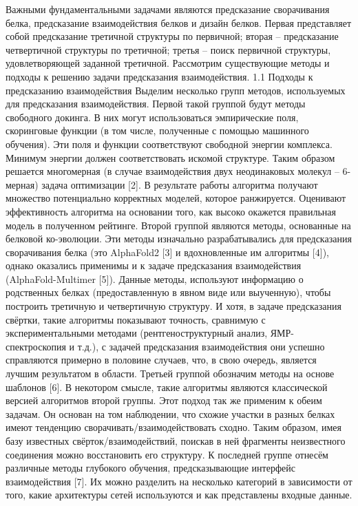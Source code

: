 Важными фундаментальными задачами являются предсказание сворачивания белка, предсказание взаимодействия белков и дизайн белков. Первая представляет собой предсказание третичной структуры по первичной; вторая – предсказание четвертичной структуры по третичной; третья – поиск первичной структуры, удовлетворяющей заданной третичной. Рассмотрим существующие методы и подходы к решению задачи предсказания взаимодействия.
1.1 Подходы к предсказанию взаимодействия
	Выделим несколько групп методов, используемых для предсказания взаимодействия. Первой такой группой будут методы свободного докинга. В них могут использоваться эмпирические поля, скоринговые функции (в том числе, полученные с помощью машинного обучения). Эти поля и функции соответствуют свободной энергии комплекса. Минимум энергии должен соответствовать искомой структуре. Таким образом решается многомерная (в случае взаимодействия двух неодинаковых молекул – 6-мерная) задача оптимизации [2]. В результате работы алгоритма получают множество потенциально корректных моделей, которое ранжируется. Оценивают эффективность алгоритма на основании того, как высоко окажется правильная модель в полученном рейтинге.
	Второй группой являются методы, основанные на белковой ко-эволюции. Эти методы изначально разрабатывались для предсказания сворачивания белка  (это AlphaFold2 [3] и вдохновленные им алгоритмы [4]), однако оказались применимы и к задаче предсказания взаимодействия (AlphaFold-Multimer [5]). Данные методы, используют информацию о родственных белках (предоставленную в явном виде или выученную), чтобы построить третичную и четвертичную структуру. И хотя, в задаче предсказания свёртки, такие алгоритмы показывают точность, сравнимую с экспериментальными методами (рентгеноструктурный анализ, ЯМР-спектроскопия и т.д.), с задачей предсказания взаимодействия они успешно справляются примерно в половине случаев, что, в свою очередь, является лучшим результатом в области.
	Третьей группой обозначим методы на основе шаблонов [6]. В некотором смысле, такие алгоритмы являются классической версией алгоритмов второй группы. Этот подход так же применим к обеим задачам. Он основан на том наблюдении, что схожие участки в разных белках имеют тенденцию сворачивать/взаимодействовать сходно. Таким образом, имея базу известных свёрток/взаимодействий, поискав в ней фрагменты неизвестного соединения можно восстановить его структуру.
	К последней группе отнесём различные методы глубокого обучения, предсказывающие интерфейс взаимодействия [7]. Их можно разделить на несколько категорий в зависимости от того, какие архитектуры сетей используются и как представлены входные данные.
